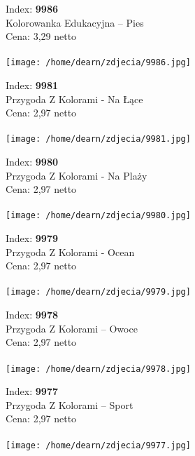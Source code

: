 {Index: \textbf{9986}\\
Kolorowanka Edukacyjna – Pies \\
Cena: 3,29 netto   \\\\  \texttt{[image: /home/dearn/zdjecia/9986.jpg]}}\newline\newline

{Index: \textbf{9981}\\
Przygoda Z Kolorami - Na Łące \\
Cena: 2,97 netto   \\\\  \texttt{[image: /home/dearn/zdjecia/9981.jpg]}}\newline\newline

{Index: \textbf{9980}\\
Przygoda Z Kolorami - Na Plaży \\
Cena: 2,97 netto   \\\\  \texttt{[image: /home/dearn/zdjecia/9980.jpg]}}\newline\newline

{Index: \textbf{9979}\\
Przygoda Z Kolorami - Ocean \\
Cena: 2,97 netto   \\\\  \texttt{[image: /home/dearn/zdjecia/9979.jpg]}}\newline\newline

{Index: \textbf{9978}\\
Przygoda Z Kolorami – Owoce\\
Cena: 2,97 netto   \\\\  \texttt{[image: /home/dearn/zdjecia/9978.jpg]}}\newline\newline

{Index: \textbf{9977}\\
Przygoda Z Kolorami – Sport\\
Cena: 2,97 netto   \\\\  \texttt{[image: /home/dearn/zdjecia/9977.jpg]}}\newline\newline


